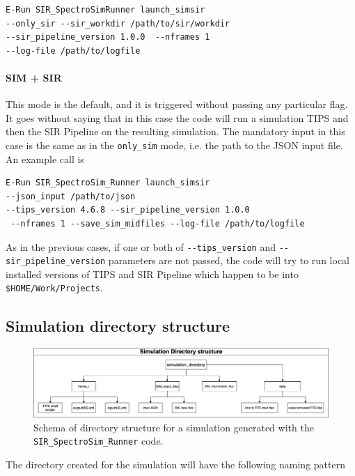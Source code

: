 \begin{verbatim}
E-Run SIR_SpectroSimRunner launch_simsir 
--only_sir --sir_workdir /path/to/sir/workdir
--sir_pipeline_version 1.0.0  --nframes 1
--log-file /path/to/logfile
\end{verbatim}

\paragraph{SIM + SIR}
This mode is the default, and it is triggered without passing any particular flag. It goes without saying that in this case the code will run a simulation TIPS and then the SIR Pipeline on the resulting simulation. The mandatory input in this case is the same as in the \verb+only_sim+ mode, i.e. the path to the JSON input file. An example call is

\begin{verbatim}
E-Run SIR_SpectroSim_Runner launch_simsir 
--json_input /path/to/json
--tips_version 4.6.8 --sir_pipeline_version 1.0.0
 --nframes 1 --save_sim_midfiles --log-file /path/to/logfile
\end{verbatim}

As in the previous cases, if one or both of \verb+--tips_version+ and \verb+--sir_pipeline_version+ parameters are not passed, the code will try to run local installed versions of TIPS and SIR Pipeline which happen to be into \verb+$HOME/Work/Projects+.

\subsection{Simulation directory structure}

\begin{figure}
\centering
\includegraphics[scale=0.35]{figures/TIPS_usage-sir_runner_dir_structure.png}
\caption{Schema of directory structure for a simulation generated with the \texttt{SIR\_SpectroSim\_Runner} code.}
\label{fig:sim_dir_tree}
\end{figure}

The directory created for the simulation will have the following naming pattern

